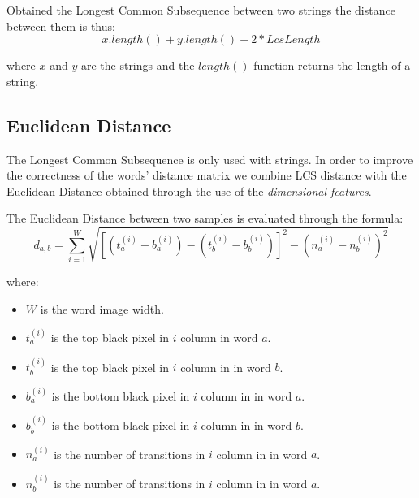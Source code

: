 Obtained the Longest Common Subsequence between two strings the distance between them is thus:
$$ x.length() + y.length() - 2*LcsLength$$

where $x$ and $y$ are the strings and the $length()$ function returns the length of a string.

\subsection{Euclidean Distance} 

The Longest Common Subsequence is only used with strings. In order to improve the correctness of the words' distance matrix we combine LCS distance with the Euclidean Distance obtained through the use of the \textit{dimensional features}.

The Euclidean Distance between two samples is evaluated through the formula:
$$d_{a,b} = \sum_{i = 1}^{W} \sqrt{[(t_{a}^{(i)} - b_{a}^{(i)}) - (t_{b}^{(i)} - b_{b}^{(i)})]^2 - (n_{a}^{(i)} - n_{b}^{(i)})^2}$$

where:
\begin{itemize}
\item $W$ is the word image width.
\item $t_{a}^{(i)}$ is the top black pixel in $i$ column in word $a$.
\item $t_{b}^{(i)}$ is the top black pixel in $i$ column in in word $b$.
\item $b_{a}^{(i)}$ is the bottom black pixel in $i$ column in in word $a$.
\item $b_{b}^{(i)}$ is the bottom black pixel in $i$ column in in word $b$.
\item $n_{a}^{(i)}$ is the number of transitions in $i$ column in in word $a$.
\item $n_{b}^{(i)}$ is the number of transitions in $i$ column in in word $a$.
\end{itemize}
